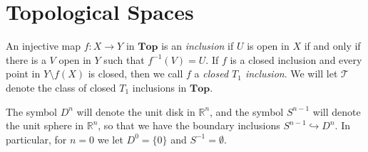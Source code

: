 \documentclass{amsart}
\theoremstyle{plain}
\theoremstyle{definition}
\newtheorem{definition}[theorem]{Definition}
\DeclareMathOperator{\Ch}{Ch}
\newcommand{\Top}{\mbf{Top}}
\newcommand{\0}{\mathbf{0}}
\newcommand{\bR}{\mathbb{R}}
\newcommand{\into}{\hookrightarrow}
\newcommand{\cT}{\mathcal T}
\newcommand{\mbf}[1]{\mathbf{#1}}
\newcommand{\bZ}{\mathbb{Z}}
\renewcommand{\(}{\left(}
\renewcommand{\)}{\right)}
\newcommand{\Cof}{\mathcal C\mathrm{of}}
\newcommand{\Fib}{\mathcal F\mathrm{ib}}
\newcommand{\W}{\mathcal W}
\newcommand{\inj}{\text-\mathrm{inj}}
\newcommand{\cof}{\text-\mathrm{cof}}
\begin{document}
%
%
%

\section{Topological Spaces}

An injective map $f:X\to Y$ in $\Top$ is an \textit{inclusion} if $U$ is open in $X$ if and only if there is a $V$ open in $Y$ such that $f^{-1}(V)=U$. If $f$ is a closed inclusion and every point in $Y\setminus f(X)$ is closed, then we call $f$ a \textit{closed $T_1$ inclusion}. We will let $\cT$ denote the class of closed $T_1$ inclusions in $\Top$.

The symbol $D^n$ will denote the unit disk in $\bR^n$, and the symbol $S^{n-1}$ will denote the unit sphere in $\bR^n$, so that we have the boundary inclusions $S^{n-1}\into D^n$. In particular, for $n=0$ we let $D^0=\{0\}$ and $S^{-1}=\emptyset$.
\end{document}
